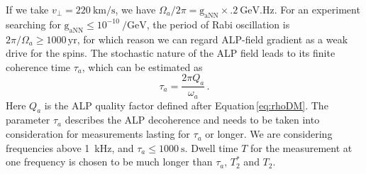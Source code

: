 \documentclass{WileyMSP-template}
\newcommand{\DB}[1]{\textcolor{blue}{#1}}
\newcommand{\YZ}[1]{\textcolor{purple}{Yuzhe: #1}}
\newcommand{\HB}[1]{\textcolor{orange}{Hendrik: #1}}
\newcommand{\DK}[1]{\textcolor{brown}{Derek: #1}}
\newcommand{\AW}[1]{\textcolor{cyan}{Arne: #1}}
\begin{document}
	If we take $v_{\bot} = \SI{220}{\km\per\second}$, we have $\Omega_a/2\pi=\mathrm{g_{aNN}}\times\SI{.2}{\GeV.\Hz}$. For an experiment searching for $\mathrm{g_{aNN}}\leq 10^{-10}\SI{}{\per\GeV}$, the period of Rabi oscillation is $2\pi/\Omega_a \geq 1000\,\mathrm{yr}$, for which reason we can regard ALP-field gradient as a weak drive for the spins. 
	The stochastic nature of the ALP field \cite{Centers2021Stochastic, Gramolin2022_SpectralPhysRevD} leads to its finite coherence time $\tau_a$, which can be estimated as
	\begin{equation}
		\tau_a = \dfrac{2\pi Q_a}{\omega_a}
		\,.\label{eq:taua_Qa_omegaa}
	\end{equation}
	Here $Q_a$ is the ALP quality factor defined after Equation\,\eqref{eq:rhoDM}.
	The parameter $\tau_a$ describes the ALP decoherence and needs to be taken into consideration for measurements lasting for $\tau_a$ or longer. 
	We are considering frequencies above \SI{1}{\kHz}, and $\tau_a \leq \SI{1000}{\second}$. Dwell time $T$ for the measurement at one frequency is chosen to be much longer than $\tau_a,\, T_2^*$ and $T_2$.
\end{document}
